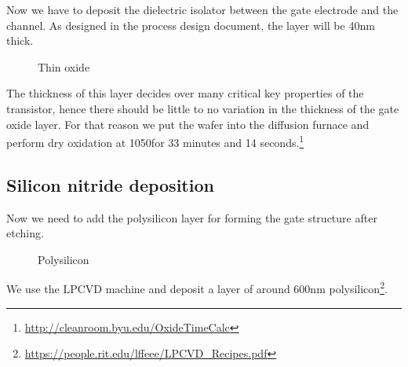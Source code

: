 Now we have to deposit the dielectric isolator between the gate electrode and the channel.
As designed in the process design document, the layer will be 40nm thick.

\begin{figure}[H]
	\centering
	\begin{tikzpicture}[node distance = 3cm, auto, thick,scale=\CrossSectionOnly, every node/.style={transform shape}]
		
	\end{tikzpicture}
	\begin{tikzpicture}[node distance = 3cm, auto, thick,scale=\CrossSectionOnly, every node/.style={transform shape}]
		
	\end{tikzpicture}
	\caption{Thin oxide}
\end{figure}
The thickness of this layer decides over many critical key properties of the transistor, hence there should be little to no variation in the thickness of the gate oxide layer.
For that reason we put the wafer into the diffusion furnace and perform dry oxidation at 1050\degreesC for 33 minutes and 14 seconds.\footnote{\url{http://cleanroom.byu.edu/OxideTimeCalc}}

\subsection{Silicon nitride deposition}\label{step_depositing_poly}

Now we need to add the polysilicon layer for forming the gate structure after etching.

\begin{figure}[H]
	\centering
	\begin{tikzpicture}[node distance = 3cm, auto, thick,scale=\CrossSectionOnly, every node/.style={transform shape}]
		
	\end{tikzpicture}
	\drawStepArrow{}
	\begin{tikzpicture}[node distance = 3cm, auto, thick,scale=\CrossSectionOnly, every node/.style={transform shape}]
		
	\end{tikzpicture}
	\caption{Polysilicon}
\end{figure}

We use the LPCVD machine and deposit a layer of around 600nm polysilicon\footnote{\url{https://people.rit.edu/lffeee/LPCVD_Recipes.pdf}}.


